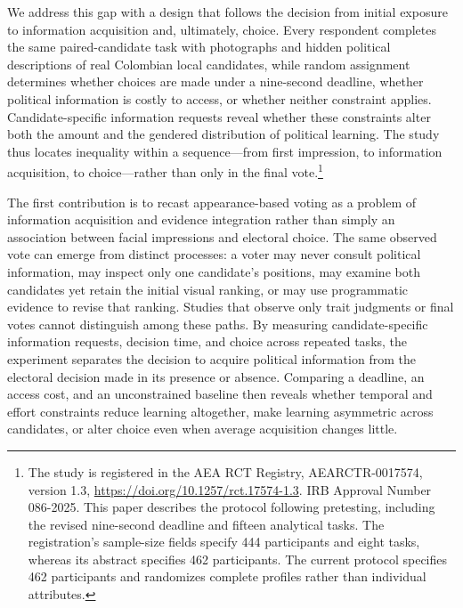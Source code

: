 \documentclass[11pt]{article}\usepackage[]{graphicx}\usepackage[]{xcolor}
\begin{document}
We address this gap with a design that follows the decision from initial exposure to information acquisition and, ultimately, choice. Every respondent completes the same paired-candidate task with photographs and hidden political descriptions of real Colombian local candidates, while random assignment determines whether choices are made under a nine-second deadline, whether political information is costly to access, or whether neither constraint applies. Candidate-specific information requests reveal whether these constraints alter both the amount and the gendered distribution of political learning. The study thus locates inequality within a sequence---from first impression, to information acquisition, to choice---rather than only in the final vote.\footnote{The study is registered in the AEA RCT Registry, AEARCTR-0017574, version 1.3, \url{https://doi.org/10.1257/rct.17574-1.3}. IRB Approval Number 086-2025. This paper describes the protocol following pretesting, including the revised nine-second deadline and fifteen analytical tasks. The registration's sample-size fields specify 444 participants and eight tasks, whereas its abstract specifies 462 participants. The current protocol specifies 462 participants and randomizes complete profiles rather than individual attributes.}

The first contribution is to recast appearance-based voting as a problem of information acquisition and evidence integration rather than simply an association between facial impressions and electoral choice. The same observed vote can emerge from distinct processes: a voter may never consult political information, may inspect only one candidate's positions, may examine both candidates yet retain the initial visual ranking, or may use programmatic evidence to revise that ranking. Studies that observe only trait judgments or final votes cannot distinguish among these paths. By measuring candidate-specific information requests, decision time, and choice across repeated tasks, the experiment separates the decision to acquire political information from the electoral decision made in its presence or absence. Comparing a deadline, an access cost, and an unconstrained baseline then reveals whether temporal and effort constraints reduce learning altogether, make learning asymmetric across candidates, or alter choice even when average acquisition changes little.
\end{document}
